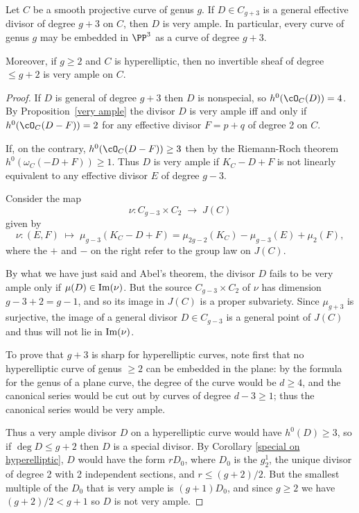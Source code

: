 \begin{theorem}[$g+3$ theorem]\label{g+3 theorem}
Let $C$ be a smooth projective curve of genus $g$. If $D \in C_{g+3}$ is a general effective divisor of degree $g+3$ on $C$, then 
$D$ is very ample. In particular, every curve of genus $g$ may be embedded in $\PP^{3}$ as a curve of degree $g+3$. 

Moreover, if $g\geq 2$ and $C$ is hyperelliptic, then no invertible sheaf of degree $\leq g+2$ is very ample on $C$.
\end{theorem}

\begin{proof}
If $D$ is general of degree $g+3$ then $D$ is nonspecial, so $h^0(\cO_C(D)) = 4$. By Proposition~\ref{very ample} the divisor
$D$ is very ample iff and only if $h^0(\cO_C(D-F)) = 2$
for any effective divisor $F = p+q$ of degree 2 on $C$.

If, on the contrary, $h^0(\cO_C(D-F)) \geq 3$ then by the Riemann-Roch theorem $h^0(\omega_C(-D + F)) \geq 1$. Thus $D$ is very ample if $K_C - D + F$ is not linearly equivalent to 
any effective divisor $E$ of degree $g-3$.

Consider the map 
$$
\nu : C_{g-3} \times C_{2} \; \to \; J(C)
$$
given by
$$
\nu : (E,F) \; \mapsto \; \mu_{g-3}(K_C - D + F) = \mu_{2g-2}(K_C) - \mu_{g-3}(E) + \mu_{2}(F), 
$$
where the $+$ and $-$ on the right refer to the group law on $J(C)$. 

By what we have just said and Abel's theorem, the divisor $D$ fails to be very ample only if
$\mu(D) \in {\rm Im}(\nu)$. But the source $C_{g-3} \times C_{2}$ of $\nu$ has dimension $g-3+2 = g-1$, and so its image in $J(C)$ is a proper subvariety. Since $\mu_{g+3}$ is surjective, the image of a general divisor $D \in C_{g-3}$ is a general point of $J(C)$ and thus will not lie in ${\rm Im}(\nu)$. 

To prove that $g+3$ is sharp for hyperelliptic curves, note first that no hyperelliptic curve of genus $\geq 2$ can
be embedded in the plane: by the formula for the genus of a plane curve, the degree of the curve would be $d \geq 4$, and the canonical series would be cut out by curves of degree $d-3\geq 1$; thus the canonical series would be very ample.

Thus a very ample divisor $D$ on a hyperelliptic curve would have $h^0(D) \geq 3$, so if $\deg D \leq g+2$
then $D$ is a special divisor. By Corollary \ref{special on hyperelliptic}, $D$ would have the form
$rD_0$, where $D_0$ is the $g^1_2$, the unique divisor of degree 2 with 2 independent sections,
and $r \leq (g+2)/2$. But the smallest multiple of the $D_0$ that is very ample is $(g+1)D_0$, and
since $g\geq 2$ we have $(g+2)/2 < g+1$ so $D$ is not very ample.
\end{proof}

